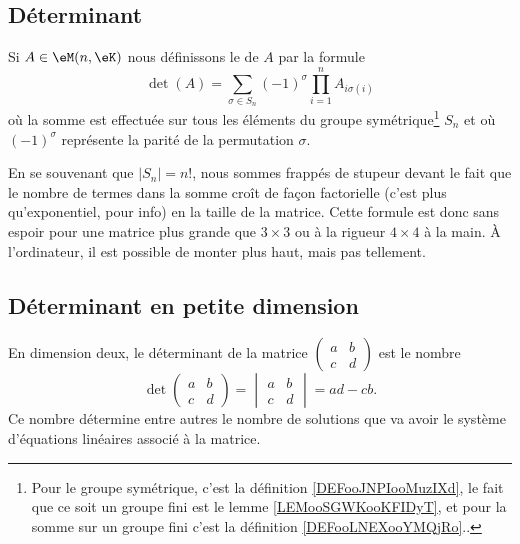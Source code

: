 \subsection{Déterminant}

\begin{definition}      \label{DEFooYCKRooTrajdP}
    Si \( A\in\eM(n,\eK)\) nous définissons le  de \( A\) par la formule
    \begin{equation}
        \det(A)=\sum_{\sigma\in S_n}(-1)^{\sigma}\prod_{i=1}^nA_{i\sigma(i)}
    \end{equation}
    où la somme est effectuée sur tous les éléments du groupe symétrique\footnote{Pour le groupe symétrique, c'est la définition \ref{DEFooJNPIooMuzIXd}, le fait que ce soit un groupe fini est le lemme \ref{LEMooSGWKooKFIDyT}, et pour la somme sur un groupe fini c'est la définition \ref{DEFooLNEXooYMQjRo}..} \( S_n\) et où \( (-1)^{\sigma}\) représente la parité de la permutation \( \sigma\).
\end{definition}
En se souvenant que \( | S_n |=n!\), nous sommes frappés de stupeur devant le fait que le nombre de termes dans la somme croît de façon factorielle (c'est plus qu'exponentiel, pour info) en la taille de la matrice. Cette formule est donc sans espoir pour une matrice plus grande que \( 3\times 3\) ou à la rigueur \( 4\times 4\) à la main. À l'ordinateur, il est possible de monter plus haut, mais pas tellement.

\subsection{Déterminant en petite dimension}

En dimension deux, le déterminant de la matrice
    $\begin{pmatrix}
        a    &   b    \\
        c    &   d
    \end{pmatrix}$
est le nombre
\begin{equation}        \label{EQooQRGVooChwRMd}
     \det\begin{pmatrix}
         a   &   b    \\
         c   &   d
     \end{pmatrix}=\begin{vmatrix}
          a  &   b    \\
        c    &   d
    \end{vmatrix}=ad-cb.
\end{equation}
Ce nombre détermine entre autres le nombre de solutions que va avoir le système d'équations linéaires associé à la matrice.

